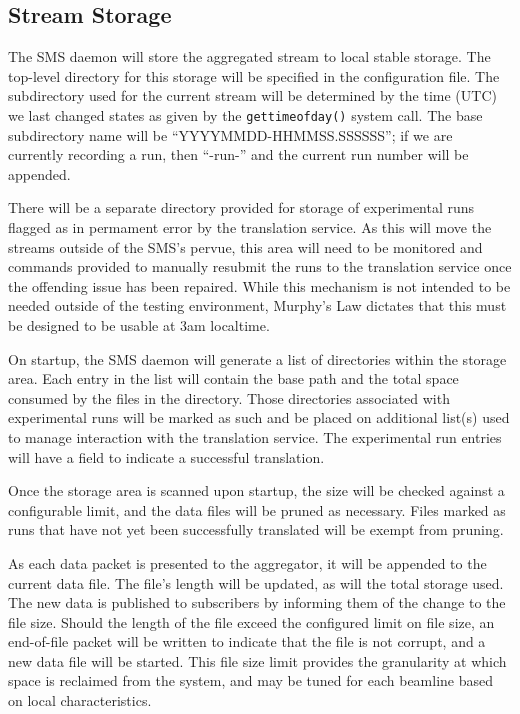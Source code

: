 \subsection{Stream Storage}
\label{sec:storage}

The SMS daemon will store the aggregated stream to local stable storage. The
top-level directory for this storage will be specified in the configuration
file.  The subdirectory used for the current stream will be determined by the
time (UTC) we last changed states as given by the {\tt gettimeofday()} system
call. The base subdirectory name will be ``YYYYMMDD-HHMMSS.SSSSSS''; if we are
currently recording a run, then ``-run-'' and the current run number will be
appended.

There will be a separate directory provided for storage of experimental runs
flagged as in permament error by the translation service. As this will move the
streams outside of the SMS's pervue, this area will need to be monitored and
commands provided to manually resubmit the runs to the translation service once
the offending issue has been repaired. While this mechanism is not intended to
be needed outside of the testing environment, Murphy's Law dictates that this
must be designed to be usable at 3am localtime.

On startup, the SMS daemon will generate a list of directories within the
storage area. Each entry in the list will contain the base path and the total
space consumed by the files in the directory. Those directories associated with
experimental runs will be marked as such and be placed on additional list(s)
used to manage interaction with the translation service. The experimental run
entries will have a field to indicate a successful translation.

Once the storage area is scanned upon startup, the size will be checked
against a configurable limit, and the data files will be pruned as necessary.
Files marked as runs that have not yet been successfully translated will be
exempt from pruning.

As each data packet is presented to the aggregator, it will be appended to the
current data file. The file's length will be updated, as will the total storage
used. The new data is published to subscribers by informing them of the change
to the file size. Should the length of the file exceed the configured limit on
file size, an end-of-file packet will be written to indicate that the file is
not corrupt, and a new data file will be started. This file size limit provides
the granularity at which space is reclaimed from the system, and may be tuned
for each beamline based on local characteristics.

